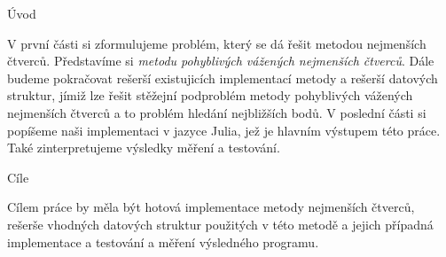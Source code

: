 \chap Úvod

V první části si zformulujeme problém, který se dá řešit metodou nejmenších čtverců. Představíme si {\it metodu pohyblivých vážených nejmenších čtverců}. Dále budeme pokračovat rešerší existujicích implementací metody a rešerší datových struktur, jímiž lze řešit stěžejní podproblém metody pohyblivých vážených nejmenších čtverců a to problém hledání nejbližších bodů. V poslední části si popíšeme naši implementaci v jazyce Julia, jež je hlavním výstupem této práce. Také zinterpretujeme výsledky měření a testování.

\sec Cíle

Cílem práce by měla být hotová implementace metody nejmenších čtverců, rešerše vhodných datových struktur použitých v této metodě a jejich případná implementace a testování a měření výsledného programu.
